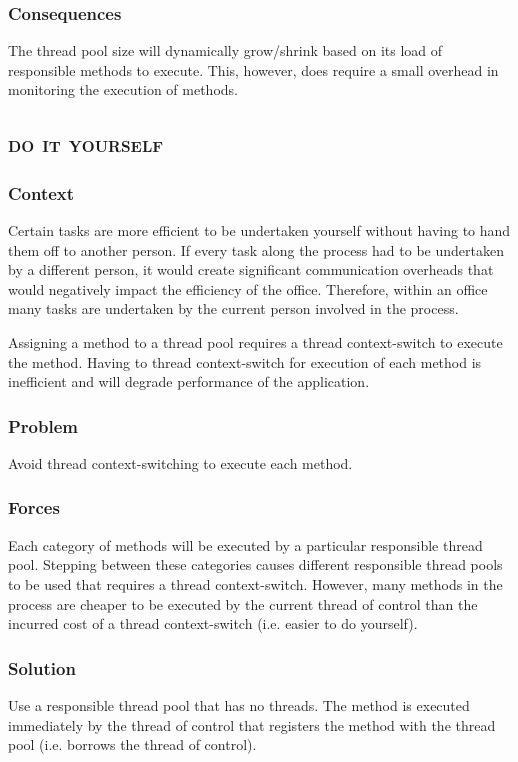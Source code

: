\documentclass[prodmode]{style/acmlarge}
\begin{document}
\subsubsection*{Consequences} The thread pool size will dynamically grow/shrink
based on its load of responsible methods to execute.  This, however, does
require a small overhead in monitoring the execution of methods.



\subsection{\textsc{\textbf{do it yourself}}}

\subsubsection*{Context} Certain tasks are more efficient to be undertaken
yourself without having to hand them off to another person.  If every task along
the process had to be undertaken by a different person, it would create
significant communication overheads that would negatively impact the efficiency
of the office.  Therefore, within an office many tasks are undertaken by the
current person involved in the process.

Assigning a method to a thread pool requires a thread context-switch to execute
the method.  Having to thread context-switch for execution of each method is
inefficient and will degrade performance of the application.

\subsubsection*{Problem} Avoid thread context-switching to execute each method.

\subsubsection*{Forces} Each category of methods will be executed by a
particular responsible thread pool.  Stepping between these categories causes
different responsible thread pools to be used that requires a thread
context-switch.  However, many methods in the process are cheaper to be
executed by the current thread of control than the incurred cost of a thread
context-switch (i.e. easier to do yourself).

\subsubsection*{Solution} Use a responsible thread pool that has no threads.
The method is executed immediately by the thread of control that registers the
method with the thread pool (i.e. borrows the thread of control).
\end{document}
